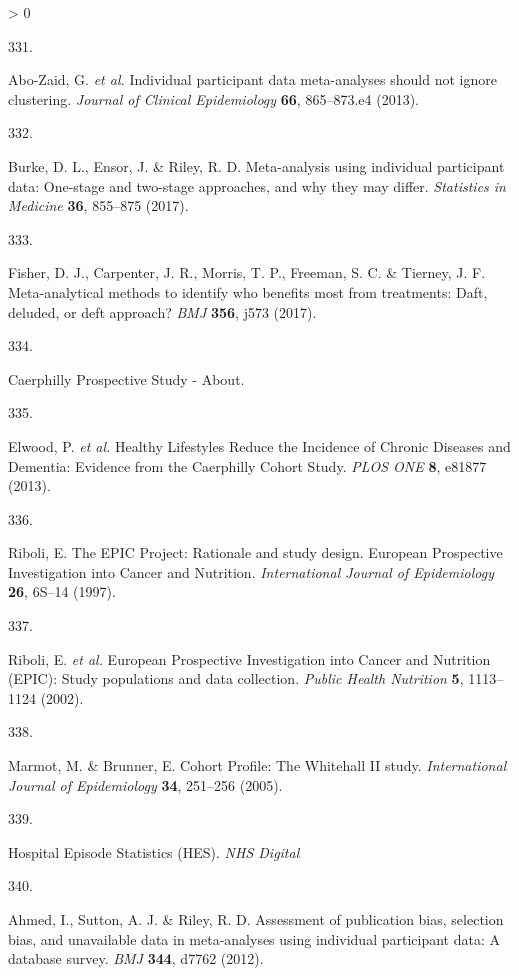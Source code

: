 \documentclass[a4paper, twoside]{templates/ociamthesis}
\newlength{\cslhangindent}
\newlength{\csllabelwidth}
\newenvironment{CSLReferences}[3] %
 {%
  \setlength{\parindent}{0pt}
  \ifodd #1 \everypar{\setlength{\hangindent}{\cslhangindent}}\ignorespaces\fi
  \ifnum #2 > 0
  \setlength{\parskip}{#2\baselineskip}
  \fi
 }%
 {}
\newcommand{\CSLLeftMargin}[1]{\parbox[t]{\maxof{\widthof{#1}}{\csllabelwidth}}{#1}}
\newcommand{\CSLRightInline}[1]{\parbox[t]{\linewidth - \csllabelwidth}{#1}}
\begin{document}
\begin{CSLReferences}{0}{0}
\leavevmode\hypertarget{ref-abo-zaid2013}{}%
\CSLLeftMargin{331. }
\CSLRightInline{Abo-Zaid, G. \emph{et al.} Individual participant data meta-analyses should not ignore clustering. \emph{Journal of Clinical Epidemiology} \textbf{66}, 865--873.e4 (2013).}

\leavevmode\hypertarget{ref-burke2017}{}%
\CSLLeftMargin{332. }
\CSLRightInline{Burke, D. L., Ensor, J. \& Riley, R. D. Meta-analysis using individual participant data: One-stage and two-stage approaches, and why they may differ. \emph{Statistics in Medicine} \textbf{36}, 855--875 (2017).}

\leavevmode\hypertarget{ref-fisher2017}{}%
\CSLLeftMargin{333. }
\CSLRightInline{Fisher, D. J., Carpenter, J. R., Morris, T. P., Freeman, S. C. \& Tierney, J. F. Meta-analytical methods to identify who benefits most from treatments: Daft, deluded, or deft approach? \emph{BMJ} \textbf{356}, j573 (2017).}

\leavevmode\hypertarget{ref-zotero-15398}{}%
\CSLLeftMargin{334. }
\CSLRightInline{Caerphilly {Prospective Study} - {About}.}

\leavevmode\hypertarget{ref-elwood2013}{}%
\CSLLeftMargin{335. }
\CSLRightInline{Elwood, P. \emph{et al.} Healthy {Lifestyles Reduce} the {Incidence} of {Chronic Diseases} and {Dementia}: Evidence from the {Caerphilly Cohort Study}. \emph{PLOS ONE} \textbf{8}, e81877 (2013).}

\leavevmode\hypertarget{ref-riboli1997}{}%
\CSLLeftMargin{336. }
\CSLRightInline{Riboli, E. The {EPIC Project}: Rationale and study design. {European Prospective Investigation} into {Cancer} and {Nutrition}. \emph{International Journal of Epidemiology} \textbf{26}, 6S--14 (1997).}

\leavevmode\hypertarget{ref-riboli2002}{}%
\CSLLeftMargin{337. }
\CSLRightInline{Riboli, E. \emph{et al.} European {Prospective Investigation} into {Cancer} and {Nutrition} ({EPIC}): Study populations and data collection. \emph{Public Health Nutrition} \textbf{5}, 1113--1124 (2002).}

\leavevmode\hypertarget{ref-marmot2005}{}%
\CSLLeftMargin{338. }
\CSLRightInline{Marmot, M. \& Brunner, E. Cohort {Profile}: The {Whitehall II} study. \emph{International Journal of Epidemiology} \textbf{34}, 251--256 (2005).}

\leavevmode\hypertarget{ref-zotero-15403}{}%
\CSLLeftMargin{339. }
\CSLRightInline{Hospital {Episode Statistics} ({HES}). \emph{NHS Digital}}

\leavevmode\hypertarget{ref-ahmed2012}{}%
\CSLLeftMargin{340. }
\CSLRightInline{Ahmed, I., Sutton, A. J. \& Riley, R. D. Assessment of publication bias, selection bias, and unavailable data in meta-analyses using individual participant data: A database survey. \emph{BMJ} \textbf{344}, d7762 (2012).}


\end{CSLReferences}
\end{document}
